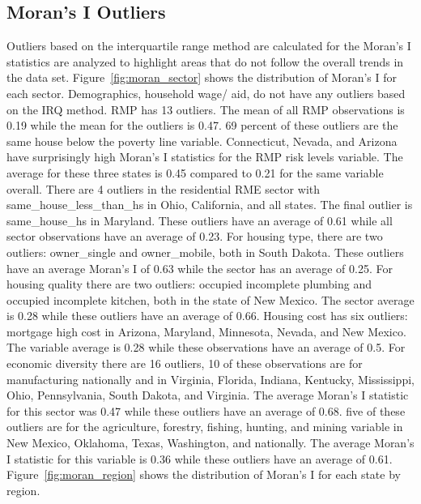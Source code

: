 \subsection{Moran's I Outliers}
Outliers based on the interquartile range method are calculated for the Moran's I statistics are analyzed to highlight areas that do not follow the overall trends in the data set. Figure~\ref{fig:moran_sector} shows the distribution of Moran's I for each sector. Demographics, household wage/ aid, do not have any outliers based on the IRQ method. RMP has 13 outliers. The mean of all RMP observations is 0.19 while the mean for the outliers is 0.47. 69 percent of these outliers are the same house below the poverty line variable. Connecticut, Nevada, and Arizona have surprisingly high Moran’s I statistics for the RMP risk levels variable. The average for these three states is 0.45 compared to 0.21 for the same variable overall. There are 4 outliers in the residential RME sector with same\_house\_less\_than\_hs in Ohio, California, and all states. The final outlier is same\_house\_hs in Maryland. These outliers have an average of 0.61 while all sector observations have an average of 0.23. For housing type, there are two outliers: owner\_single and owner\_mobile, both in South Dakota. These outliers have an average Moran’s I of 0.63 while the sector has an average of 0.25. For housing quality there are two outliers: occupied incomplete plumbing and occupied incomplete kitchen, both in the state of New Mexico. The sector average is 0.28 while these outliers have an average of 0.66. Housing cost has six outliers: mortgage high cost in Arizona, Maryland, Minnesota, Nevada, and New Mexico. The variable average is 0.28 while these observations have an average of 0.5. For economic diversity there are 16 outliers, 10 of these observations are for manufacturing nationally and in Virginia, Florida, Indiana, Kentucky, Mississippi, Ohio, Pennsylvania, South Dakota, and Virginia. The average Moran’s I statistic for this sector was 0.47 while these outliers have an average of 0.68. five of these outliers are for the agriculture, forestry, fishing, hunting, and mining variable in New Mexico, Oklahoma, Texas, Washington, and nationally. The average Moran’s I statistic for this variable is 0.36 while these outliers have an average of 0.61. Figure~\ref{fig:moran_region} shows the distribution of Moran's I for each state by region.


